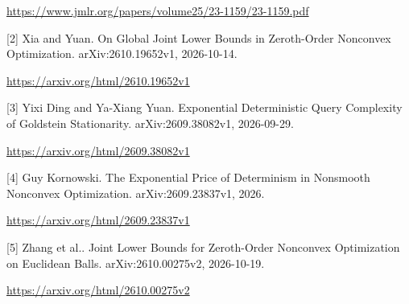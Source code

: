 \documentclass[10pt,a4paper]{article}
\begin{document}
\url{https://www.jmlr.org/papers/volume25/23-1159/23-1159.pdf}

[2] Xia and Yuan. On Global Joint Lower Bounds in Zeroth-Order Nonconvex Optimization. arXiv:2610.19652v1, 2026-10-14.

\url{https://arxiv.org/html/2610.19652v1}

[3] Yixi Ding and Ya-Xiang Yuan. Exponential Deterministic Query Complexity of Goldstein Stationarity. arXiv:2609.38082v1, 2026-09-29.

\url{https://arxiv.org/html/2609.38082v1}

[4] Guy Kornowski. The Exponential Price of Determinism in Nonsmooth Nonconvex Optimization. arXiv:2609.23837v1, 2026.

\url{https://arxiv.org/html/2609.23837v1}

[5] Zhang et al.. Joint Lower Bounds for Zeroth-Order Nonconvex Optimization on Euclidean Balls. arXiv:2610.00275v2, 2026-10-19.

\url{https://arxiv.org/html/2610.00275v2}
\end{document}
